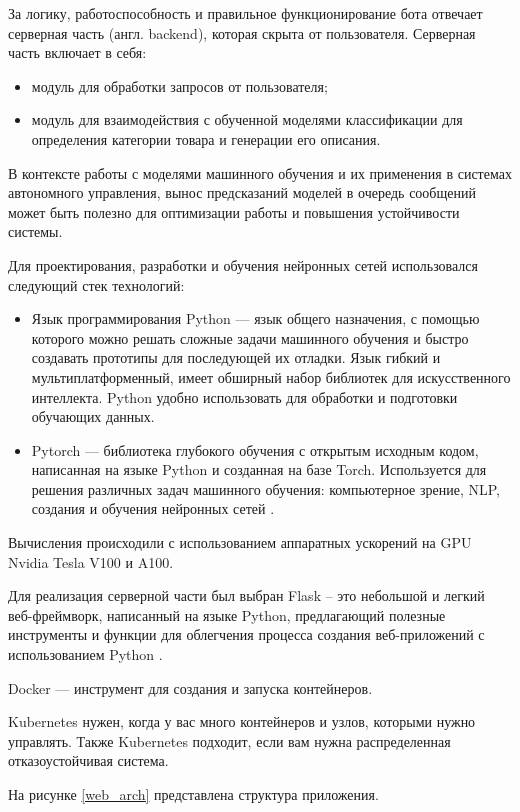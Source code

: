 \documentclass[a4paper,12pt]{extarticle}
\begin{document}
За логику, работоспособность и правильное функционирование бота 
отвечает серверная часть (англ. backend), которая скрыта от пользователя. Серверная часть включает в себя:
\begin{itemize}
	\item модуль для обработки запросов от пользователя;
	\item модуль для взаимодействия с обученной моделями классификации для определения категории товара и генерации его описания.
\end{itemize}

В контексте работы с моделями машинного обучения и их применения в системах автономного управления, вынос предсказаний моделей в очередь сообщений может быть полезно для оптимизации работы и повышения устойчивости системы.

Для проектирования, разработки и обучения нейронных сетей использовался следующий стек технологий:
\begin{itemize}
	\item Язык программирования Python — язык общего назначения, с помощью которого можно решать сложные задачи машинного обучения и быстро создавать прототипы для последующей их отладки. Язык гибкий и мультиплатформенный, имеет обширный набор библиотек для искусственного интеллекта. Python удобно использовать для обработки и подготовки обучающих данных.
	\item Pytorch — библиотека глубокого обучения с открытым исходным кодом, написанная на языке Python и созданная на базе Torch. Используется для решения различных задач машинного обучения: компьютерное зрение, NLP, создания и обучения нейронных сетей \cite{pytorch}.
\end{itemize}

Вычисления происходили с использованием аппаратных ускорений на GPU Nvidia Tesla V100 и A100.

Для реализация серверной части был выбран Flask – это небольшой и легкий веб-фреймворк, написанный на языке Python, предлагающий полезные инструменты и функции для облегчения процесса создания веб-приложений с использованием Python \cite{flask}.

Docker — инструмент для создания и запуска контейнеров.

Kubernetes нужен, когда у вас много контейнеров и узлов, которыми нужно управлять. Также Kubernetes подходит, если вам нужна распределенная отказоустойчивая система.


На рисунке \ref{web_arch} представлена структура приложения.
\end{document}
